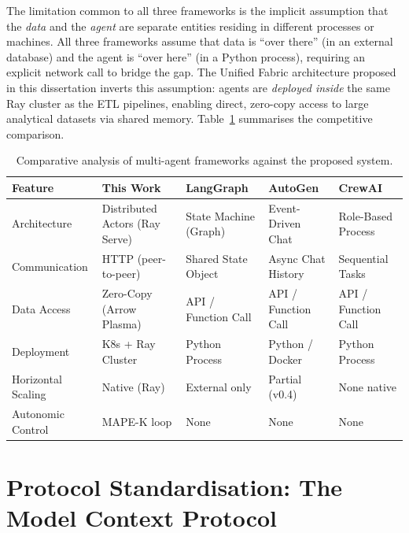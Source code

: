 \documentclass[12pt, a4paper]{report}
\begin{document}
The limitation common to all three frameworks is the implicit assumption that the
\emph{data} and the \emph{agent} are separate entities residing in different processes or
machines.
All three frameworks assume that data is ``over there'' (in an external database) and the
agent is ``over here'' (in a Python process), requiring an explicit network call to bridge
the gap.
The Unified Fabric architecture proposed in this dissertation inverts this assumption:
agents are \emph{deployed inside} the same Ray cluster as the ETL pipelines, enabling
direct, zero-copy access to large analytical datasets via shared memory.
Table~\ref{tab:framework_comparison} summarises the competitive comparison.

\begin{table}[H]
  \centering
  \caption{Comparative analysis of multi-agent frameworks against the proposed system.}
  \label{tab:framework_comparison}
  \begin{tabularx}{\textwidth}{lXXXX}
    \toprule
    \textbf{Feature} &
    \textbf{This Work} &
    \textbf{LangGraph} &
    \textbf{AutoGen} &
    \textbf{CrewAI} \\
    \midrule
    Architecture &
    Distributed Actors (Ray Serve) &
    State Machine (Graph) &
    Event-Driven Chat &
    Role-Based Process \\
    \addlinespace
    Communication &
    HTTP (peer-to-peer) &
    Shared State Object &
    Async Chat History &
    Sequential Tasks \\
    \addlinespace
    Data Access &
    Zero-Copy (Arrow Plasma) &
    API / Function Call &
    API / Function Call &
    API / Function Call \\
    \addlinespace
    Deployment &
    K8s + Ray Cluster &
    Python Process &
    Python / Docker &
    Python Process \\
    \addlinespace
    Horizontal Scaling &
    Native (Ray) &
    External only &
    Partial (v0.4) &
    None native \\
    \addlinespace
    Autonomic Control &
    MAPE-K loop &
    None & None & None \\
    \bottomrule
  \end{tabularx}
\end{table}

\section{Protocol Standardisation: The Model Context Protocol}
\label{sec:mcp}
\end{document}
